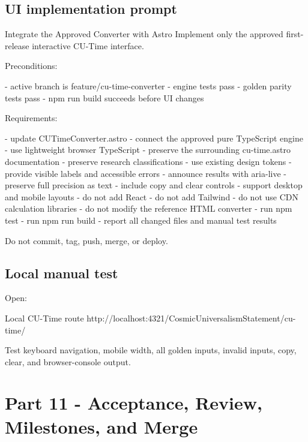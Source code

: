 \documentclass[11pt,letterpaper]{article}
\begin{document}
\subsection{UI implementation prompt}

\begin{promptbox}{Integrate the Approved Converter with Astro}
Implement only the approved first-release interactive CU-Time
interface.

Preconditions:

- active branch is feature/cu-time-converter
- engine tests pass
- golden parity tests pass
- npm run build succeeds before UI changes

Requirements:

- update CUTimeConverter.astro
- connect the approved pure TypeScript engine
- use lightweight browser TypeScript
- preserve the surrounding cu-time.astro documentation
- preserve research classifications
- use existing design tokens
- provide visible labels and accessible errors
- announce results with aria-live
- preserve full precision as text
- include copy and clear controls
- support desktop and mobile layouts
- do not add React
- do not add Tailwind
- do not use CDN calculation libraries
- do not modify the reference HTML converter
- run npm test
- run npm run build
- report all changed files and manual test results

Do not commit, tag, push, merge, or deploy.
\end{promptbox}

\subsection{Local manual test}


Open:

\begin{codebox}{Local CU-Time route}
http://localhost:4321/CosmicUniversalismStatement/cu-time/
\end{codebox}

Test keyboard navigation, mobile width, all golden inputs, invalid inputs, copy,
clear, and browser-console output.

\section{Part 11 - Acceptance, Review, Milestones, and Merge}
\end{document}
